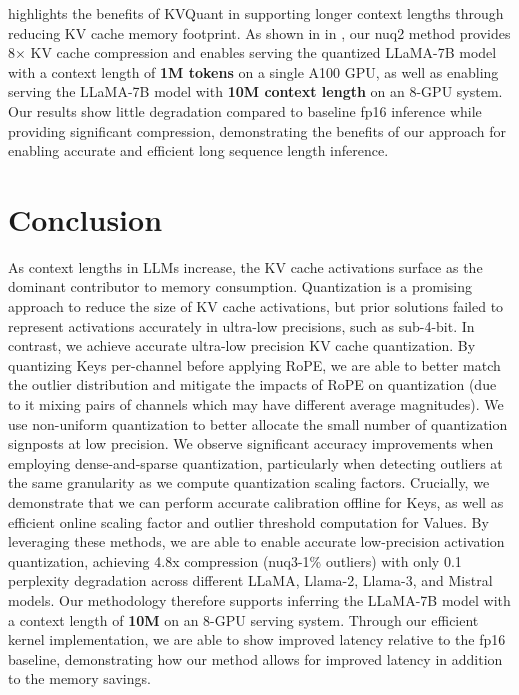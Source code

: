  highlights the benefits of {KVQuant} in supporting longer context lengths through reducing KV cache memory footprint. As shown in  in , our nuq2 method provides 8$\times$ KV cache compression and enables serving the quantized LLaMA-7B model with a context length of \textbf{1M tokens} on a single A100 GPU, as well as enabling serving the LLaMA-7B model with \textbf{10M context length} on an 8-GPU system. Our results show little degradation compared to baseline fp16 inference while providing significant compression, demonstrating the benefits of our approach for enabling accurate and efficient long sequence length inference.

\section{Conclusion}
\label{sec:conclusion}

As context lengths in LLMs increase, the KV cache activations surface as the dominant contributor to memory consumption. Quantization is a promising approach to reduce the size of KV cache activations, but prior solutions failed to represent activations accurately in ultra-low precisions, such as sub-4-bit. In contrast, we achieve accurate ultra-low precision KV cache quantization. By quantizing Keys per-channel before applying RoPE, we are able to better match the outlier distribution and mitigate the impacts of RoPE on quantization (due to it mixing pairs of channels which may have different average magnitudes). We use non-uniform quantization to better allocate the small number of quantization signposts at low precision. We observe significant accuracy improvements when employing dense-and-sparse quantization, particularly when detecting outliers at the same granularity as we compute quantization scaling factors. Crucially, we demonstrate that we can perform accurate calibration offline for Keys, as well as efficient online scaling factor and outlier threshold computation for Values. By leveraging these methods, we are able to enable accurate low-precision activation quantization, achieving 4.8x compression (nuq3-1\% outliers) with only 0.1 perplexity degradation across different LLaMA, Llama-2, Llama-3, and Mistral models. Our methodology therefore supports inferring the LLaMA-7B model with a context length of \textbf{10M} on an 8-GPU serving system. Through our efficient kernel implementation, we are able to show improved latency relative to the fp16 baseline, demonstrating how our method allows for improved latency in addition to the memory savings.


